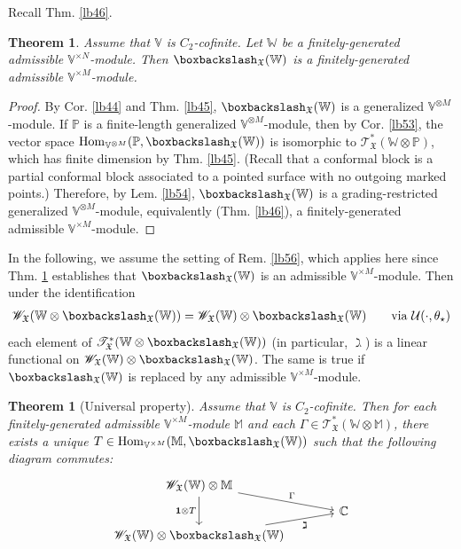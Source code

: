 \documentclass[11pt,b5paper,notitlepage]{article}
\theoremstyle{definition}
\theoremstyle{plain}
\newtheorem{thm}[df]{Theorem}
\newcommand{\fk}{\mathfrak}
\newcommand{\mc}{\mathcal}
\newcommand{\idt}{\mathbf{1}}
\newcommand{\Hom}{\mathrm{Hom}}
\newcommand{\scr}{\mathscr}
\newcommand{\Vbb}{\mathbb V}
\newcommand{\Wbb}{\mathbb W}
\newcommand{\Mbb}{\mathbb M}
\newcommand{\Cbb}{\mathbb C}
\newcommand{\Pbb}{\mathbb P}
\newcommand{\<}{\left\langle}
\renewcommand{\>}{\right\rangle}
\newcommand{\fx}{\mathfrak{X}}
\newcommand{\bbs}{\boxbackslash}
\numberwithin{equation}{section}
\begin{document}
Recall Thm. \ref{lb46}. 



\begin{thm}\label{lb57}
Assume that $\Vbb$ is $C_2$-cofinite. Let $\Wbb$ be a finitely-generated admissible $\Vbb^{\times N}$-module. Then $\boxbackslash_{\fx}(\Wbb)$ is a finitely-generated admissible $\Vbb^{\times M}$-module.
\end{thm}



\begin{proof}
By Cor. \ref{lb44} and Thm. \ref{lb45}, $\bbs_\fx(\Wbb)$ is a generalized $\Vbb^{\otimes M}$-module. If $\Pbb$ is a finite-length generalized $\Vbb^{\otimes M}$-module, then by Cor. \ref{lb53}, the vector space $\Hom_{\Vbb^{\otimes M}}(\Pbb,\bbs_\fx(\Wbb))$ is isomorphic to $\scr T_{\fk X}^*(\Wbb\otimes\Pbb)$, which has finite dimension by Thm. \ref{lb45}. (Recall that a conformal block is a partial conformal block associated to a pointed surface with no outgoing marked points.) Therefore, by Lem. \ref{lb54}, $\bbs_\fx(\Wbb)$ is a grading-restricted generalized $\Vbb^{\otimes M}$-module, equivalently (Thm. \ref{lb46}), a finitely-generated admissible $\Vbb^{\times M}$-module.
\end{proof}

In the following, we assume the setting of Rem. \ref{lb56}, which applies here since Thm. \ref{lb57} establishes that $\bbs_\fx(\Wbb)$ is an admissible $\Vbb^{\times M}$-module. Then under the identification
\begin{align}
\scr W_\fx(\Wbb\otimes\bbs_\fx(\Wbb))=\scr W_\fx(\Wbb)\otimes\bbs_\fx(\Wbb)\qquad\text{via }\mc U(\cdot,\theta_\star)
\end{align}
each element of $\scr T_\fx^*(\Wbb\otimes\bbs_\fx(\Wbb))$ (in particular, $\gimel$) is a linear functional on $\scr W_\fx(\Wbb)\otimes\bbs_\fx(\Wbb)$. The same is true if $\bbs_\fx(\Wbb)$ is replaced by any admissible $\Vbb^{\times M}$-module.

\begin{thm}[Universal property]\label{lb55}
Assume that $\Vbb$ is $C_2$-cofinite.  Then for each finitely-generated admissible $\Vbb^{\times M}$-module $\Mbb$ and each $\Gamma\in\scr T_{\fk X}^*(\Wbb\otimes\Mbb)$, there exists a unique $T\in\Hom_{\Vbb^{\times M}}(\Mbb,\bbs_\fx(\Wbb))$ such that the following diagram commutes:
\begin{equation}
\begin{tikzcd}[row sep=tiny, column sep=large]
\scr W_\fx(\Wbb)\otimes\Mbb \arrow[rd,"\Gamma"] \arrow[dd,"\idt\otimes T"'] &   \\
                        & \Cbb \\
\scr W_\fx(\Wbb)\otimes\bbs_\fx(\Wbb) \arrow[ru,"\gimel"']            &  
\end{tikzcd}
\end{equation}
\end{thm}
\end{document}

